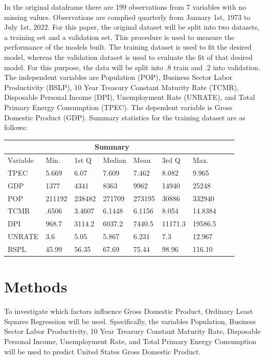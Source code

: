 \documentclass[12pt]{article}
\begin{document}
In the original dataframe there are 199 observations from 7 variables with no missing values.
Observations are complied quarterly from January 1st, 1973 to July 1st, 2022.  
For this paper, the original dataset will be split into two datasets, a training set and a validation set. 
This procedure is used to measure the performance of the models built. 
The training dataset is used to fit the desired model, whereas the validation dataset is used to evaluate the fit of that desired model. 
For this purpose, the data will be split into .8 train and .2 into validation.
The independent variables are Population (POP), Business Sector Labor Productivity (BSLP), 10 Year Treasury Constant Maturity Rate (TCMR), Disposable Personal Income (DPI), Unemployment Rate (UNRATE), and Total Primary Energy Consumption (TPEC). 
The dependent variable is Gross Domestic Product (GDP).
Summary statistics for the training dataset are as follows:
\begin{center}
\begin{tabular}{ |p{1.75cm}||p{1.25cm}|p{1.25cm}|p{1.25cm}|p{1.25cm}|p{1.25cm}|p{1.25cm}|p{1.25cm}|p{1.25cm}| }
  \hline
  \multicolumn{7}{|c|}{Summary} \\
  \hline
  Variable & Min. & 1st Q & Median & Mean & 3rd Q & Max. \\
  \hline
  TPEC & 5.669 & 6.07& 7.609 & 7.462 & 8.082 & 9.965\\
  GDP &  1377 & 4341 & 8363 & 9962 & 14940 & 25248\\
  POP & 211192 & 238482 & 271709 & 273195 & 30886 & 332940\\
  TCMR & .6506 & 3.4607 & 6.1448 & 6.1156 & 8.054 & 14.8384\\
  DPI & 968.7 & 3114.2 & 6037.2 & 7440.5 & 11171.3 & 19586.5\\
  UNRATE & 3.6 & 5.05 & 5.867 & 6.231 & 7.3 & 12.967\\
  BSPL & 45.99 & 56.35 & 67.69 & 75.44 & 98.96 & 116.10\\
  \hline
\end{tabular}
\end{center}

\section*{Methods}
To investigate which factors influence Gross Domestic Product, Ordinary Least Squares Regressiion will be used. 
Specifically, the variables Population, Business Sector Labor Productivity, 10 Year Treasury Constant Maturity Rate, Disposable Personal Income, Unemployment Rate, and Total Primary Energy Consumption will be used to predict United States Gross Domestic Product.
\end{document}
